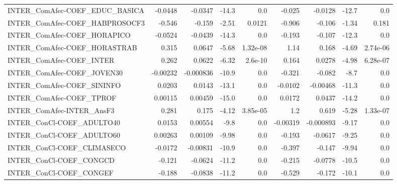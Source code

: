 \begin{tabular}{lrrrrrrrr}
INTER\_ComAfec-COEF\_EDUC\_BASICA      &     -0.0448 &      -0.0347 &   -14.3 &      0.0 &     -0.025 &     -0.0128 &        -12.7 &           0.0 \\
INTER\_ComAfec-COEF\_HABPROSOCF3      &      -0.546 &       -0.159 &   -2.51 &   0.0121 &     -0.906 &      -0.106 &        -1.34 &         0.181 \\
INTER\_ComAfec-COEF\_HORAPICO         &     -0.0524 &      -0.0439 &   -14.3 &      0.0 &     -0.193 &      -0.107 &        -12.3 &           0.0 \\
INTER\_ComAfec-COEF\_HORASTRAB        &       0.315 &       0.0647 &   -5.68 & 1.32e-08 &       1.14 &       0.168 &        -4.69 &      2.74e-06 \\
INTER\_ComAfec-COEF\_INTER            &       0.262 &       0.0622 &   -6.32 &  2.6e-10 &      0.164 &      0.0278 &        -4.98 &      6.28e-07 \\
INTER\_ComAfec-COEF\_JOVEN30          &    -0.00232 &    -0.000836 &   -10.9 &      0.0 &     -0.321 &      -0.082 &         -8.7 &           0.0 \\
INTER\_ComAfec-COEF\_SININFO          &      0.0203 &       0.0143 &   -13.1 &      0.0 &    -0.0102 &    -0.00468 &        -11.3 &           0.0 \\
INTER\_ComAfec-COEF\_TPROF            &     0.00115 &      0.00459 &   -15.0 &      0.0 &     0.0172 &      0.0437 &        -14.2 &           0.0 \\
INTER\_ComAfec-INTER\_AnsF3           &       0.281 &        0.175 &   -4.12 & 3.85e-05 &        1.2 &       0.619 &        -5.28 &      1.33e-07 \\
INTER\_ConCl-COEF\_ADULTO40           &      0.0153 &      0.00554 &    -9.8 &      0.0 &   -0.00319 &   -0.000893 &        -9.17 &           0.0 \\
INTER\_ConCl-COEF\_ADULTO60           &     0.00263 &      0.00109 &   -9.98 &      0.0 &     -0.193 &     -0.0617 &        -9.25 &           0.0 \\
INTER\_ConCl-COEF\_CLIMASECO          &     -0.0172 &     -0.00831 &   -10.9 &      0.0 &     -0.397 &      -0.147 &        -9.94 &           0.0 \\
INTER\_ConCl-COEF\_CONGCD             &      -0.121 &      -0.0624 &   -11.2 &      0.0 &     -0.215 &     -0.0778 &        -10.5 &           0.0 \\
INTER\_ConCl-COEF\_CONGEF             &      -0.188 &      -0.0838 &   -11.2 &      0.0 &     -0.529 &      -0.172 &        -10.1 &           0.0 \\

\end{tabular}
